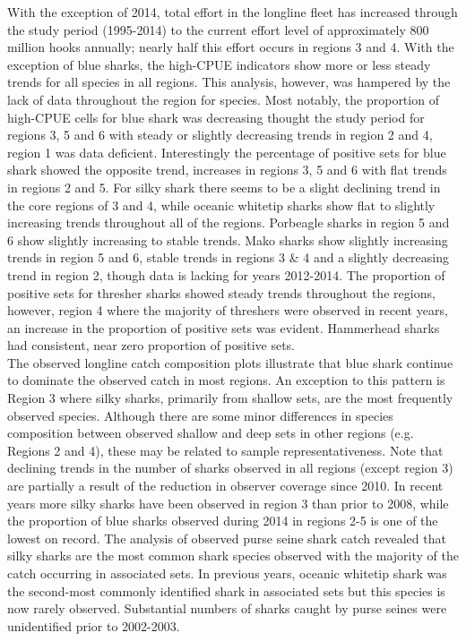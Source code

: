 \documentclass[12pt]{SCreport}
\begin{document}
With the exception of 2014, total effort in the longline fleet has increased through the study period (1995-2014) to the current effort level of approximately 800 million hooks annually; nearly half this effort occurs in regions 3 and 4. With the exception of blue sharks, the high-CPUE indicators show more or less steady trends for all species in all regions. This analysis, however, was hampered by the lack of data throughout the region for species. Most notably, the proportion of high-CPUE cells for blue shark was decreasing thought the study period for regions 3, 5 and 6 with steady or slightly decreasing trends in region 2 and 4, region 1 was data deficient. Interestingly the percentage of positive sets for blue shark showed the opposite trend, increases in regions 3, 5 and 6 with flat trends in regions 2 and 5. For silky shark there seems to be a slight declining trend in the core regions of 3 and 4, while oceanic whitetip sharks show flat to slightly increasing trends throughout all of the regions. Porbeagle sharks in region 5 and 6 show slightly increasing to stable trends. Mako sharks show slightly increasing trends in region 5 and 6, stable trends in regions 3 \& 4 and a slightly decreasing trend in region 2, though data is lacking for years 2012-2014. The proportion of positive sets for thresher sharks showed steady trends throughout the regions, however, region 4 where the majority of threshers were observed in recent years, an increase in the proportion of positive sets was evident. Hammerhead sharks had consistent, near zero proportion of positive sets. 
\\
The observed longline catch composition plots illustrate that blue shark continue to dominate the observed catch in most regions. An exception to this pattern is Region 3 where silky sharks, primarily from shallow sets, are the most frequently observed species. Although there are some minor differences in species composition between observed shallow and deep sets in other regions (e.g. Regions 2 and 4), these may be related to sample representativeness. Note that declining trends in the number of sharks observed in all regions (except region 3) are partially a result of the reduction in observer coverage since 2010. In recent years more silky sharks have been observed in region 3 than prior to 2008, while the proportion of blue sharks observed during 2014 in regions 2-5 is one of the lowest on record. The analysis of observed purse seine shark catch revealed that silky sharks are the most common shark species observed with the majority of the catch occurring in associated sets. In previous years, oceanic whitetip shark was the second-most commonly identified shark in associated sets but this species is now rarely observed. Substantial numbers of sharks caught by purse seines were unidentified prior to 2002-2003.
\end{document}

